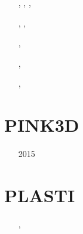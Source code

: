 \begin{small}
\begin{itemize}
\item[\twothousandfourteen]    \textcite{frba14},  \textcite{gagb14}, 
                               \textcite{bufa14},  \textcite{bufy14b}
\item[\twothousandfifteen]     \textcite{wulc15},  \textcite{gebw15}, \textcite{svlh15}
\item[\twothousandsixteen]     \textcite{marl16},  \textcite{jala16}
\item[\twothousandseventeen]   \textcite{petc17}
\item[\twothousandeighteen]    \textcite{gesr18}
\item[\twothousandnineteen]    \textcite{jala19},  \textcite{chjl19}
\item[\twothousandtwentyone]   \textcite{deol21},  \textcite{bamg21} 
\item[\twothousandtwentythree] \textcite{gojd23} 
\end{itemize}
\end{small}

\section{PINK3D}

\begin{small}
\begin{itemize}
\item[2015] \textcite{vosc15}
\end{itemize}
\end{small}

\section{PLASTI}

\begin{small}
\begin{itemize}
\item[\twothousandsix]       \textcite{fuwb06}, \textcite{fuwf06}
\item[\twothousandthirteen]  \textcite{cass13}
\item[\twothousandtwenty]    \textcite{femb20}
\item[\twothousandtwentyone] \textcite{femc21}
\end{itemize}
\end{small}

